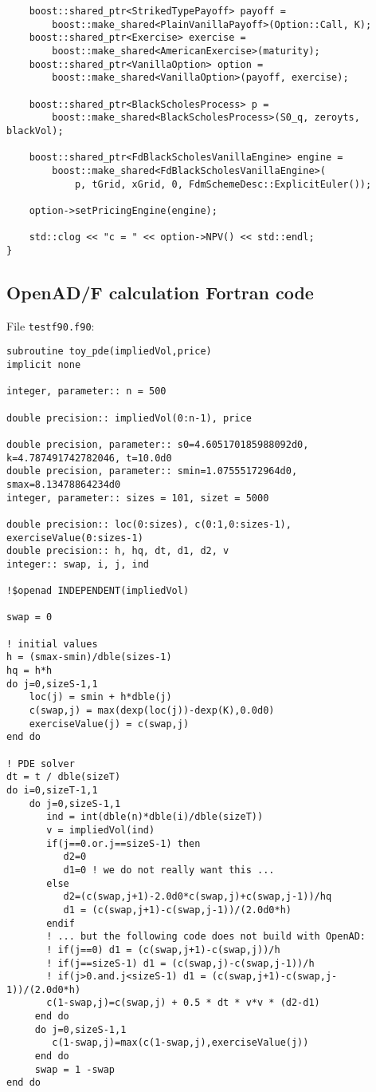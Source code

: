 \documentclass{amsart}
\theoremstyle{plain}
\numberwithin{equation}{section}
\begin{document}
\begin{appendix}
\begin{verbatim}
    boost::shared_ptr<StrikedTypePayoff> payoff =
        boost::make_shared<PlainVanillaPayoff>(Option::Call, K);
    boost::shared_ptr<Exercise> exercise =
        boost::make_shared<AmericanExercise>(maturity);
    boost::shared_ptr<VanillaOption> option =
        boost::make_shared<VanillaOption>(payoff, exercise);

    boost::shared_ptr<BlackScholesProcess> p =
        boost::make_shared<BlackScholesProcess>(S0_q, zeroyts, blackVol);

    boost::shared_ptr<FdBlackScholesVanillaEngine> engine =
        boost::make_shared<FdBlackScholesVanillaEngine>(
            p, tGrid, xGrid, 0, FdmSchemeDesc::ExplicitEuler());

    option->setPricingEngine(engine);

    std::clog << "c = " << option->NPV() << std::endl;
}
\end{verbatim}

\subsection{OpenAD/F calculation Fortran code}

File \verb+testf90.f90+:

\begin{verbatim}
subroutine toy_pde(impliedVol,price)
implicit none

integer, parameter:: n = 500

double precision:: impliedVol(0:n-1), price

double precision, parameter:: s0=4.605170185988092d0, k=4.787491742782046, t=10.0d0
double precision, parameter:: smin=1.07555172964d0, smax=8.13478864234d0
integer, parameter:: sizes = 101, sizet = 5000

double precision:: loc(0:sizes), c(0:1,0:sizes-1), exerciseValue(0:sizes-1)
double precision:: h, hq, dt, d1, d2, v
integer:: swap, i, j, ind

!$openad INDEPENDENT(impliedVol)

swap = 0

! initial values
h = (smax-smin)/dble(sizes-1)
hq = h*h
do j=0,sizeS-1,1
    loc(j) = smin + h*dble(j)
    c(swap,j) = max(dexp(loc(j))-dexp(K),0.0d0)
    exerciseValue(j) = c(swap,j)
end do

! PDE solver
dt = t / dble(sizeT)
do i=0,sizeT-1,1
    do j=0,sizeS-1,1
       ind = int(dble(n)*dble(i)/dble(sizeT))
       v = impliedVol(ind)
       if(j==0.or.j==sizeS-1) then
          d2=0
          d1=0 ! we do not really want this ...
       else
          d2=(c(swap,j+1)-2.0d0*c(swap,j)+c(swap,j-1))/hq
          d1 = (c(swap,j+1)-c(swap,j-1))/(2.0d0*h)
       endif
       ! ... but the following code does not build with OpenAD:
       ! if(j==0) d1 = (c(swap,j+1)-c(swap,j))/h
       ! if(j==sizeS-1) d1 = (c(swap,j)-c(swap,j-1))/h
       ! if(j>0.and.j<sizeS-1) d1 = (c(swap,j+1)-c(swap,j-1))/(2.0d0*h)
       c(1-swap,j)=c(swap,j) + 0.5 * dt * v*v * (d2-d1)
     end do
     do j=0,sizeS-1,1
        c(1-swap,j)=max(c(1-swap,j),exerciseValue(j))
     end do
     swap = 1 -swap
end do
  

\end{verbatim}
\end{appendix}
\end{document}
